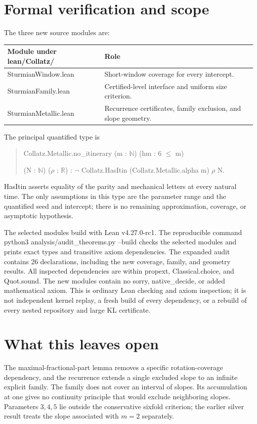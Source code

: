 \documentclass[11pt]{article}
\theoremstyle{remark}
\newcommand{\N}{\mathbb N}
\newcommand{\R}{\mathbb R}
\newcommand{\code}[1]{{\small\ttfamily #1}}
\begin{document}
\section{Formal verification and scope}
The three new source modules are:
\begin{center}
\begin{tabularx}{\textwidth}{@{}lX@{}}
\toprule
Module under \code{lean/Collatz/}&Role\\
\midrule
\code{SturmianWindow.lean}&Short-window coverage for every intercept.\\
\code{SturmianFamily.lean}&Certified-level interface and uniform size criterion.\\
\code{SturmianMetallic.lean}&Recurrence certificates, family exclusion, and slope geometry.\\
\bottomrule
\end{tabularx}
\end{center}
The principal quantified type is
\begin{quote}\small\ttfamily
Collatz.Metallic.no\_\allowbreak{}itinerary (m : $\N$) (hm : 6 $\le$ m)\par
\quad (N : $\N$) ($\rho$ : $\R$) : $\neg$ Collatz.HasItin (Collatz.Metallic.alpha m) $\rho$ N.
\end{quote}
\code{HasItin} asserts equality of the parity and mechanical letters
at every natural time. The only assumptions in this type are the
parameter range and the quantified seed and intercept; there is no
remaining approximation, coverage, or asymptotic hypothesis.

The selected modules build with Lean \code{v4.27.0-rc1}.
The reproducible command
\code{python3 analysis/audit\_\allowbreak{}theorems.py --build}
checks the selected modules and prints exact types and transitive axiom
dependencies. The expanded audit contains 26 declarations, including the
new coverage, family, and geometry results. All inspected dependencies
are within \code{propext}, \code{Classical.choice}, and \code{Quot.sound}.
The new modules contain no \code{sorry}, \code{native\_\allowbreak{}decide},
or added mathematical axiom. This is ordinary Lean checking and axiom
inspection; it is not independent kernel replay, a fresh build of every
dependency, or a rebuild of every nested repository and large KL certificate.

\section{What this leaves open}
The maximal-fractional-part lemma removes a specific rotation-coverage
dependency, and the recurrence extends a single excluded slope to an
infinite explicit family. The family does not cover an interval of slopes.
Its accumulation at one gives no continuity principle that would exclude
neighboring slopes. Parameters $3,4,5$ lie outside the conservative
sixfold criterion; the earlier silver result treats the slope associated
with $m=2$ separately.
\end{document}
